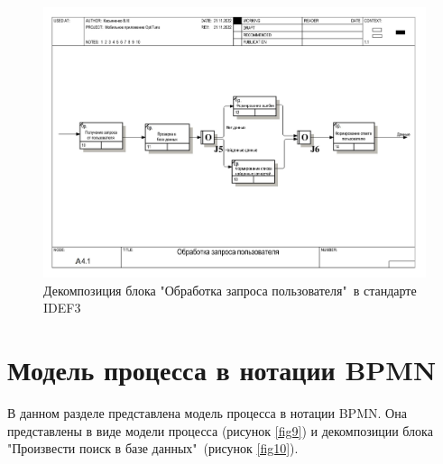 \documentclass[14pt]{extreport}
\begin{document}
\begin{landscape}
\begin{figure}[H]
\centerline{\includegraphics[width=0.9\linewidth]{idef313}}
\caption{Декомпозиция блока "Обработка запроса пользователя"\ в стандарте IDEF3}
\label{fig8}
\end{figure}
\end{landscape}

\section{Модель процесса в нотации BPMN}

В данном разделе представлена модель процесса в нотации BPMN. Она представлены в виде модели процесса  (рисунок \ref{fig9}) и декомпозиции блока "Произвести поиск в базе данных"\  (рисунок \ref{fig10}).
\end{document}

